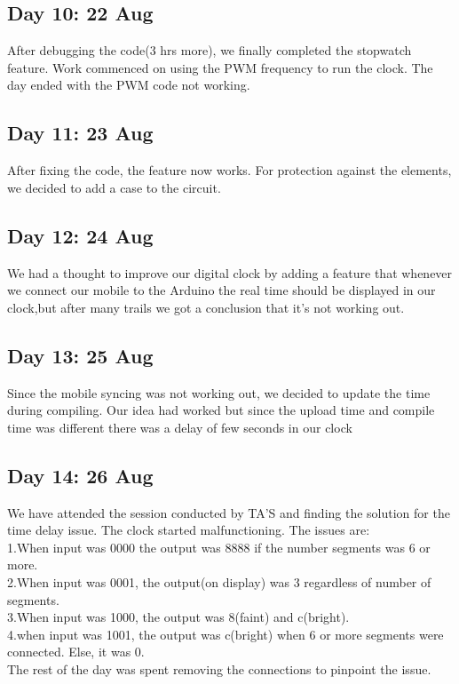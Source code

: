 \documentclass{report}
\begin{document}
\subsection{Day 10: 22 Aug}
After debugging the code(3 hrs more), we finally completed the stopwatch feature. Work commenced on using the PWM frequency to run the clock. The day ended with the PWM code not working.
\subsection{Day 11: 23 Aug}
After fixing the code, the feature now works. For protection against the elements, we decided to add a case to the circuit.
\subsection{Day 12: 24 Aug}
We had a thought to improve our digital clock  by adding a feature that whenever we connect our mobile to the Arduino
the real time should be displayed in our clock,but after many trails we got a conclusion that it's not working out.
\subsection{Day 13: 25 Aug}
Since the mobile syncing was not working out, we decided to update the time during compiling. Our idea had worked but since the upload time and compile time was different there was a delay of few seconds in our clock
\subsection{Day 14: 26 Aug }
We have attended the session conducted by TA'S and finding the solution for the time delay issue. The clock started malfunctioning. The issues are:\\
1.When input was 0000 the output was 8888 if the number segments was 6 or more.\\
2.When input was 0001, the output(on display) was 3 regardless of number of segments.\\
3.When input was 1000, the output was 8(faint) and c(bright).\\
4.when input was 1001, the output was c(bright) when 6 or more segments were connected. Else, it was 0.\\
The rest of the day was spent removing the connections to pinpoint the issue.
\end{document}
